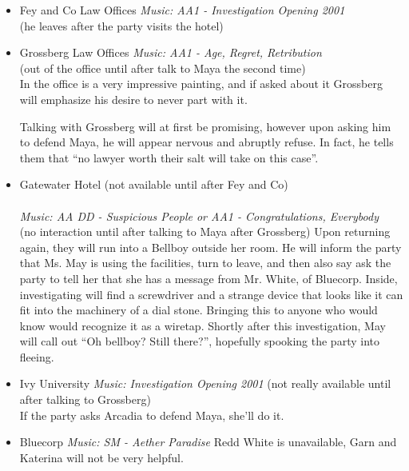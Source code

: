 \begin{itemize}
\item Fey and Co Law Offices
\textit{Music: AA1 - Investigation Opening 2001}\\


(he leaves after the party visits the hotel)

\item Grossberg Law Offices
\textit{Music: AA1 - Age, Regret, Retribution}\\
(out of the office until after talk to Maya the second time)\\
In the office is a very impressive painting, and if asked about it Grossberg will emphasize his desire to never part with it.

Talking with Grossberg will at first be promising, however upon asking him to defend Maya, he will appear nervous and abruptly refuse. In fact, he tells them that ``no lawyer worth their salt will take on this case''.


\item Gatewater Hotel
(not available until after Fey and Co)\\
\\
\textit{Music: AA DD - Suspicious People or AA1 - Congratulations, Everybody}\\	

(no interaction until after talking to Maya after Grossberg)
Upon returning again, they will run into a Bellboy outside her room. He will inform the party that Ms. May is using the facilities, turn to leave, and then also say ask the party to tell her that she has a message from Mr. White, of Bluecorp. Inside, investigating will find a screwdriver and a strange device that looks like it can fit into the machinery of a dial stone. Bringing this to anyone who would know would recognize it as a wiretap. Shortly after this investigation, May will call out ``Oh bellboy? Still there?'', hopefully spooking the party into fleeing.\\
\item Ivy University
\textit{Music: Investigation Opening 2001}
(not really available until after talking to Grossberg)\\
If the party asks Arcadia to defend Maya, she'll do it.

\item Bluecorp
\textit{Music: SM - Aether Paradise}
Redd White is unavailable, Garn and Katerina will not be very helpful.

\end{itemize}



